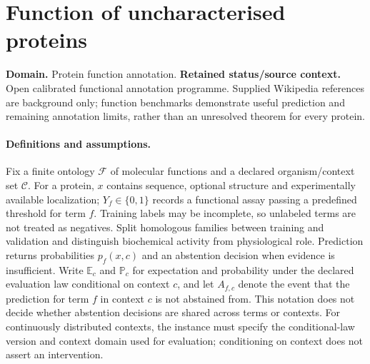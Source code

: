 \documentclass[11pt]{article}
\begin{document}
\section*{Function of uncharacterised proteins}
\label{prob:015}
\label{rank:213}
\par\smallskip

\noindent\textbf{Domain.} Protein function annotation. \quad \textbf{Retained status/source context.} Open calibrated functional annotation programme. Supplied Wikipedia references are background only; function benchmarks demonstrate useful prediction and remaining annotation limits, rather than an unresolved theorem for every protein.
\paragraph{Definitions and assumptions.} Fix a finite ontology $\mathcal F$ of molecular functions and a declared organism/context set $\mathcal C$. For a protein, $x$ contains sequence, optional structure and experimentally available localization; $Y_f\in\{0,1\}$ records a functional assay passing a predefined threshold for term $f$. Training labels may be incomplete, so unlabeled terms are not treated as negatives. Split homologous families between training and validation and distinguish biochemical activity from physiological role. Prediction returns probabilities $p_f(x,c)$ and an abstention decision when evidence is insufficient. Write $\mathbb E_c$ and $\mathbb P_c$ for expectation and probability under the declared evaluation law conditional on context $c$, and let $A_{f,c}$ denote the event that the prediction for term $f$ in context $c$ is not abstained from. This notation does not decide whether abstention decisions are shared across terms or contexts. For continuously distributed contexts, the instance must specify the conditional-law version and context domain used for evaluation; conditioning on context does not assert an intervention.
\end{document}
